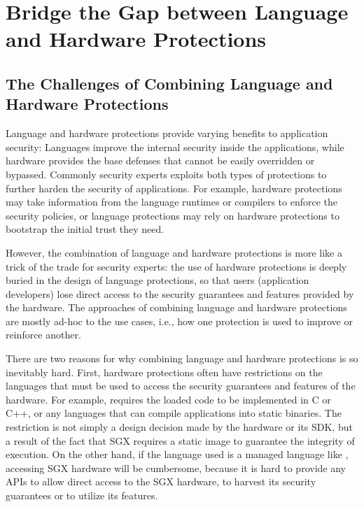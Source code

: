 \section{Bridge the Gap between Language and Hardware Protections}
\label{sec:concept}

\subsection{The Challenges of Combining Language and Hardware Protections}

Language and hardware protections provide varying benefits
to application security:
Languages improve the internal security inside the applications,
while hardware provides the base defenses that cannot be easily overridden or bypassed.
Commonly security experts exploits both types of protections
to further harden the security of applications.
For example, hardware protections may take information from the language runtimes or compilers to enforce the security policies,
or language protections may rely on hardware protections to bootstrap the initial trust they need. 

However, the combination of language and hardware protections is more
like a trick of the trade for security experts:
the use of hardware protections is deeply buried in the design of language protections,
so that users (application developers) lose direct access
to the security guarantees and features provided by the hardware.
The approaches of combining language and hardware protections are mostly ad-hoc to the use cases,
i.e., how one protection is used to improve or reinforce another.

There are two reasons for why combining language and hardware protections
is so inevitably hard.
First, hardware protections often have restrictions
on the languages that must be used
to access the security guarantees and features of the hardware.
For example, \sgx{} requires the loaded code to be implemented in C or C++,
or any languages that can compile applications into static binaries.
The restriction is not simply a design decision
made by the hardware or its SDK,
but a result of the fact that SGX requires a static image to guarantee the integrity of execution.
On the other hand, if the language used is a managed language like \java{},
accessing SGX hardware will be cumbersome,
because it is hard to provide any APIs to allow direct access to the SGX hardware,
to harvest its security guarantees
or to utilize its features.

